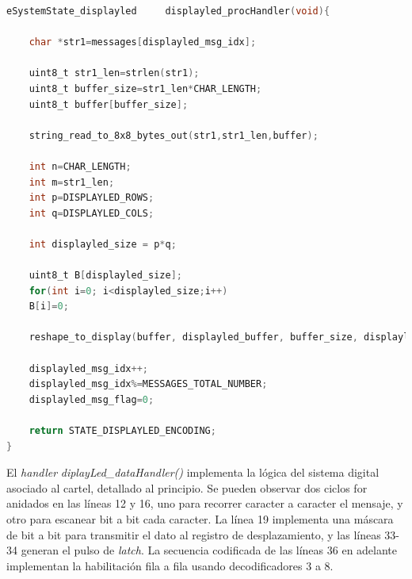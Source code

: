 \begin{lstlisting}[caption=Handler para procesamiento de datos de cartel de matriz led.,
	language=C, 
	backgroundcolor=\color{mygray},
	caption=	{Código fuente del handler de procesamiento del display led.},
	captionpos=b]
eSystemState_displayled     displayled_procHandler(void){

    char *str1=messages[displayled_msg_idx];

    uint8_t str1_len=strlen(str1);
    uint8_t buffer_size=str1_len*CHAR_LENGTH;
    uint8_t buffer[buffer_size];

    string_read_to_8x8_bytes_out(str1,str1_len,buffer);

    int n=CHAR_LENGTH; 
    int m=str1_len;
    int p=DISPLAYLED_ROWS;
    int q=DISPLAYLED_COLS;

    int displayled_size = p*q;

    uint8_t B[displayled_size];
    for(int i=0; i<displayled_size;i++)
    B[i]=0;

    reshape_to_display(buffer, displayled_buffer, buffer_size, displayled_size);

    displayled_msg_idx++;
    displayled_msg_idx%=MESSAGES_TOTAL_NUMBER;
    displayled_msg_flag=0;

    return STATE_DISPLAYLED_ENCODING;
}

\end{lstlisting}

El \textit{handler} \textit{diplayLed\_dataHandler()} implementa la lógica del sistema digital asociado al cartel, detallado al principio. Se pueden observar dos ciclos for anidados en las líneas 12 y 16, uno para recorrer caracter a caracter el mensaje, y otro para escanear bit a bit cada caracter. La línea 19 implementa una máscara de bit a bit para transmitir el dato al registro de desplazamiento, y las líneas 33-34 generan el pulso de \textit{latch}. La secuencia codificada de las líneas 36 en adelante implementan la habilitación fila a fila usando decodificadores 3 a 8. \\

